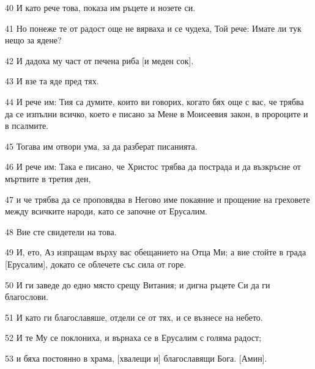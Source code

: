 \par 40 И като рече това, показа им ръцете и нозете си.
\par 41 Но понеже те от радост още не вярваха и се чудеха, Той рече: Имате ли тук нещо за ядене?
\par 42 И дадоха му част от печена риба [и меден сок].
\par 43 И взе та яде пред тях.
\par 44 И рече им: Тия са думите, които ви говорих, когато бях още с вас, че трябва да се изпълни всичко, което е писано за Мене в Моисеевия закон, в пророците и в псалмите.
\par 45 Тогава им отвори ума, за да разберат писанията.
\par 46 И рече им: Така е писано, че Христос трябва да пострада и да възкръсне от мъртвите в третия ден,
\par 47 и че трябва да се проповядва в Негово име покаяние и прощение на греховете между всичките народи, като се започне от Ерусалим.
\par 48 Вие сте свидетели на това.
\par 49 И, ето, Аз изпращам върху вас обещанието на Отца Ми; а вие стойте в града [Ерусалим], докато се облечете със сила от горе.
\par 50 И ги заведе до едно място срещу Витания; и дигна ръцете Си да ги благослови.
\par 51 И като ги благославяше, отдели се от тях, и се възнесе на небето.
\par 52 И те Му се поклониха, и върнаха се в Ерусалим с голяма радост;
\par 53 и бяха постоянно в храма, [хвалещи и] благославящи Бога. [Амин].

